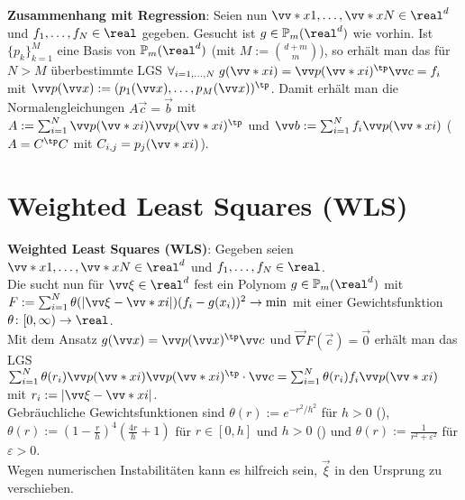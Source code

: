 \textbf{Zusammenhang mit Regression}:
Seien nun $\vecs{x}{1}, \dotsc, \vecs{x}{N} \in \real^d$ und $f_1, \dotsc, f_N \in \real$
gegeben.
Gesucht ist $g \in \PP_m(\real^d)$ wie vorhin.
Ist $\{p_k\}_{k=1}^M$ eine Basis von $\PP_m(\real^d)$
(mit $M := \binom{d+m}{m}$),
so erhält man das für $N > M$ überbestimmte LGS
$\forall_{i=1,\dotsc,N}\; g(\vecs{x}{i}) = \vec{p}(\vecs{x}{i})^\tp \vec{c} = f_i$
mit $\vec{p}(\vec{x}) := (p_1(\vec{x}), \dotsc, p_M(\vec{x}))^\tp$.
Damit erhält man die Normalengleichungen
$A\vec{c} = \vec{b}$ mit\\
$A := \sum_{i=1}^N \vec{p}(\vecs{x}{i}) \vec{p}(\vecs{x}{i})^\tp$ und
$\vec{b} := \sum_{i=1}^N f_i \vec{p}(\vecs{x}{i})$
($A = C^\tp C$ mit $C_{i,j} = p_j(\vecs{x}{i})$).

\section{%
    Weighted Least Squares (WLS)%
}

\textbf{Weighted Least Squares (WLS)}:
Gegeben seien $\vecs{x}{1}, \dotsc, \vecs{x}{N} \in \real^d$ und
$f_1, \dotsc, f_N \in \real$.\\
Die  sucht nun für $\vec{\xi} \in \real^d$ fest
ein Polynom $g \in \PP_m(\real^d)$ mit\\
$F := \sum_{i=1}^N \theta(|\vec{\xi} - \vecs{x}{i}|) (f_i - g(x_i))^2 \to \min$
mit einer Gewichtsfunktion $\theta\colon [0, \infty) \to \real$.\\
Mit dem Ansatz $g(\vec{x}) = \vec{p}(\vec{x})^\tp \vec{c}$ und
$\vec{\nabla} F(\vec{c}) = \vec{0}$ erhält man das LGS\\
$\sum_{i=1}^N \theta(r_i) \vec{p}(\vecs{x}{i}) \vec{p}(\vecs{x}{i})^\tp \cdot \vec{c}
= \sum_{i=1}^N \theta(r_i) f_i \vec{p}(\vecs{x}{i})$ mit $r_i := |\vec{\xi} - \vecs{x}{i}|$.\\
Gebräuchliche Gewichtsfunktionen sind
$\theta(r) := e^{-r^2/h^2}$ für $h > 0$ (),\\
$\theta(r) := (1 - \frac{r}{h})^4 (\frac{4r}{h} + 1)$ für $r \in [0, h]$ und $h > 0$
() und
$\theta(r) := \frac{1}{r^2 + \varepsilon^2}$ für $\varepsilon > 0$.\\
Wegen numerischen Instabilitäten kann es hilfreich sein,
$\vec{\xi}$ in den Ursprung zu verschieben.

\linie


